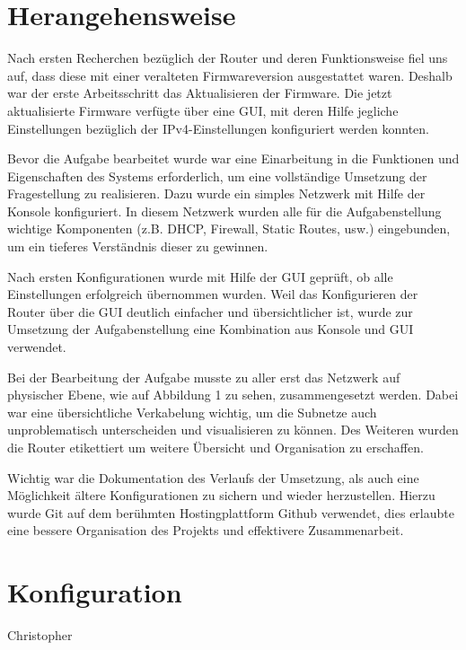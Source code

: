 \documentclass[10pt,a4paper]{article}
\begin{document}
\section{Herangehensweise}
Nach ersten Recherchen bezüglich der Router und deren Funktionsweise
fiel uns auf, dass diese mit einer veralteten Firmwareversion
ausgestattet waren. Deshalb war der erste Arbeitsschritt das
Aktualisieren der Firmware. Die jetzt aktualisierte Firmware verfügte
über eine GUI, mit deren Hilfe jegliche Einstellungen bezüglich der
IPv4-Einstellungen konfiguriert werden konnten.
\par
Bevor die Aufgabe bearbeitet wurde war eine Einarbeitung in die
Funktionen und Eigenschaften des Systems erforderlich, um eine
vollständige Umsetzung der Fragestellung zu realisieren. Dazu wurde
ein simples Netzwerk mit Hilfe der Konsole konfiguriert. In diesem
Netzwerk wurden alle für die Aufgabenstellung wichtige
Komponenten (z.B. DHCP, Firewall, Static Routes, usw.) eingebunden, um
ein tieferes Verständnis dieser zu gewinnen.
\par
Nach ersten Konfigurationen wurde mit Hilfe der GUI geprüft, ob alle
Einstellungen erfolgreich übernommen wurden. Weil das Konfigurieren
der Router über die GUI deutlich einfacher und übersichtlicher ist,
wurde zur Umsetzung der Aufgabenstellung eine Kombination aus Konsole
und GUI verwendet.
\par
Bei der Bearbeitung der Aufgabe musste zu aller erst das Netzwerk auf
physischer Ebene, wie auf Abbildung 1 zu sehen, zusammengesetzt
werden. Dabei war eine übersichtliche Verkabelung wichtig, um die
Subnetze auch unproblematisch unterscheiden und visualisieren zu
können. Des Weiteren wurden die Router etikettiert um weitere
Übersicht und Organisation zu erschaffen.
\par
Wichtig war die Dokumentation des Verlaufs der Umsetzung, als auch
eine Möglichkeit ältere Konfigurationen zu sichern und wieder
herzustellen. Hierzu wurde Git auf dem berühmten Hostingplattform
Github verwendet, dies erlaubte eine bessere Organisation des Projekts
und effektivere Zusammenarbeit.


\section{Konfiguration}Christopher
\end{document}
